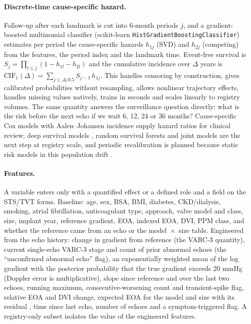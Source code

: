 \documentclass[11pt,a4paper]{article}
\newcommand{\vt}[1]{\texttt{#1}}
\begin{document}
\paragraph{Discrete-time cause-specific hazard.} Follow-up after each landmark is cut into 6-month periods $j$, and a gradient-boosted multinomial classifier (scikit-learn \vt{HistGradientBoostingClassifier}) estimates per period the cause-specific hazards $h_{1j}$ (SVD) and $h_{2j}$ (competing) from the features, the period index and the landmark time. Event-free survival is $S_j = \prod_{l\le j}(1-h_{1l}-h_{2l})$ and the cumulative incidence over $\Delta$ years is $\mathrm{CIF}_1(\Delta) = \sum_{j \le \Delta/0.5} S_{j-1}\,h_{1j}$. This handles censoring by construction, gives calibrated probabilities without resampling, allows nonlinear trajectory effects, handles missing values natively, trains in seconds and scales linearly to registry volumes. The same quantity answers the surveillance question directly: what is the risk before the next echo if we wait 6, 12, 24 or 36 months? Cause-specific Cox models with Aalen--Johansen incidence supply hazard ratios for clinical review; deep survival models \cite{lee2018,wiegrebe2023}, random survival forests \cite{ishwaran2008} and joint models \cite{rizopoulos2016} are the next step at registry scale, and periodic recalibration is planned because static risk models in this population drift \cite{pollack2023}.

\paragraph{Features.} A variable enters only with a quantified effect or a defined role and a field on the STS/TVT forms. Baseline: age, sex, BSA, BMI, diabetes, CKD/dialysis, smoking, atrial fibrillation, anticoagulant type, approach, valve model and class, size, implant year, reference gradient, EOA, indexed EOA, DVI, PPM class, and whether the reference came from an echo or the model~$\times$~size table. Engineered from the echo history: change in gradient from reference (the VARC-3 quantity), current single-echo VARC-3 stage and count of prior abnormal echoes (the ``unconfirmed abnormal echo'' flag), an exponentially weighted mean of the log gradient with the posterior probability that the true gradient exceeds 20 mmHg (Doppler error is multiplicative), slope since reference and over the last two echoes, running maximum, consecutive-worsening count and transient-spike flag, relative EOA and DVI change, expected EOA for the model and size with its residual \cite{zoghbi2024}, time since last echo, number of echoes and a symptom-triggered flag. A registry-only subset isolates the value of the engineered features.
\end{document}

